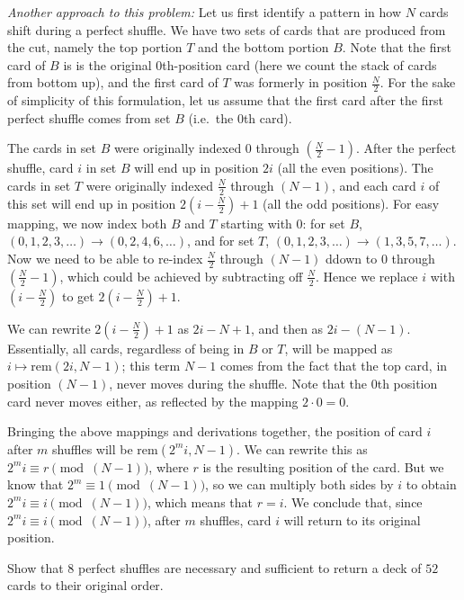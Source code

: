 \documentclass[12pt,twoside]{article}
\begin{document}
\begin{problem}{20}
{        \emph{Another approach to this problem:} Let us first identify a pattern in how $N$ cards shift during a perfect shuffle. We have two sets of cards that are produced from the cut, namely the top portion $T$ and the bottom portion $B$. Note that the first card of $B$ is is the original $0$th-position card (here we count the stack of cards from bottom up), and the first card of $T$ was formerly in position $\frac{N}{2}$. For the sake of simplicity of this formulation, let us assume that the first card after the first perfect shuffle comes from set $B$ (i.e.\ the $0$th card).

        The cards in set $B$ were originally indexed $0$ through $(\frac{N}{2} - 1)$. After the perfect shuffle, card $i$ in set $B$ will end up in position $2i$ (all the even positions). The cards in set $T$ were originally indexed $\frac{N}{2}$ through $(N-1)$, and each card $i$ of this set will end up in position $2(i - \frac{N}{2}) + 1$ (all the odd positions). For easy mapping, we now index both $B$ and $T$ starting with $0$: for set $B$, $(0,1,2,3,\ldots) \to (0,2,4,6,\ldots)$, and for set $T$, $(0,1,2,3,\ldots) \to (1,3,5,7,\ldots)$. Now we need to be able to re-index $\frac{N}{2}$ through $(N-1)$ ddown to $0$ through $(\frac{N}{2} - 1)$, which could be achieved by subtracting off $\frac{N}{2}$. Hence we replace $i$ with $(i - \frac{N}{2})$ to get $2(i - \frac{N}{2}) + 1$.

        We can rewrite $2(i - \frac{N}{2})+1$ as $2i - N + 1$, and then as $2i - (N-1)$. Essentially, all cards, regardless of being in $B$ or $T$, will be mapped as $i \mapsto \mathrm{rem}(2i,N-1)$; this term $N-1$ comes from the fact that the top card, in position $(N-1)$, never moves during the shuffle. Note that the $0$th position card never moves either, as reflected by the mapping $2 \cdot 0 = 0$.

        Bringing the above mappings and derivations together, the position of card $i$ after $m$ shuffles will be $\mathrm{rem}(2^m i, N-1)$. We can rewrite this as $2^m i \equiv r \pmod{(N-1)}$, where $r$ is the resulting position of the card. But we know that $2^m \equiv 1 \pmod{(N-1)}$, so we can multiply both sides by $i$ to obtain $2^m i \equiv i \pmod{(N-1)}$, which means that $r = i$. We conclude that, since $2^m i \equiv i \pmod{(N-1)}$, after $m$ shuffles, card $i$ will return to its original position.
         
    }

     Show that $8$ perfect shuffles are necessary and sufficient to return a deck of $52$ cards to their original order.


\end{problem}
\end{document}
